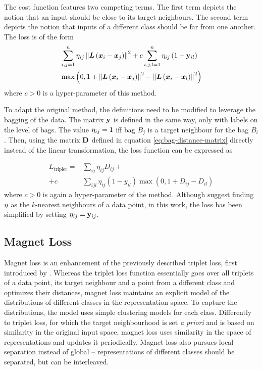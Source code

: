 The cost function features two competing terms. The first term depicts the notion that an input should be close to its target neighbours. The second term depicts the notion that inputs of a different class should be far from one another. The loss is of the form
\begin{align*}
	&\sum_{i, j = 1}^n \mathbf{\eta}_{ij} \left\lVert \bm{L} \left( \bm{x}_i - \bm{x}_j \right) \right\rVert^2 + c \sum_{i, j, l = 1}^n \mathbf{\eta}_{ij} \left( 1 - \mathbf{y}_{il} \right) \\
	&\max \left( 0, 1 + \left\lVert \bm{L} \left( \bm{x}_i - \bm{x}_j \right) \right\rVert^2 - \left\lVert \bm{L} \left( \bm{x}_i - \bm{x}_l \right) \right\rVert^2 \right)
\end{align*}
where \( c > 0 \) is a hyper-parameter of this method.

To adapt the original method, the definitions need to be modified to leverage the bagging of the data. The matrix \( \mathbf{y} \) is defined in the same way, only with labels on the level of bags. The value \( \mathbf{\eta}_{ij} = 1 \) iff bag \( B_j \) is a target neighbour for the bag \( B_i \). Then, using the matrix \( \mathbf{D} \) defined in equation \ref{eq:bag-distance-matrix} directly instead of the linear transformation, the loss function can be expressed as

\begin{align*}
	L_\mathrm{triplet} = &\sum_{ij} \eta_{ij} D_{ij} + \\
	+ c &\sum_{ijl} \eta_{ij} \left( 1 - y_{il} \right) \max \left( 0, 1 + D_{ij} - D_{il} \right)
\end{align*}
where \( c > 0 \) is again a hyper-parameter of the method. Although \cite{weinberger_distance_2006} suggest finding \( \mathbf{\eta} \) as the \( k \)-nearest neighbours of a data point, in this work, the loss has been simplified by setting \( \mathbf{\eta}_{ij} = \mathbf{y}_{ij} \).

\subsection{Magnet Loss}
Magnet loss is an enhancement of the previously described triplet loss, first introduced by \cite{rippel_metric_2015}. Whereas the triplet loss function essentially goes over all triplets of a data point, its target neighbour and a point from a different class and optimizes their distances, magnet loss maintains an explicit model of the distributions of different classes in the representation space. To capture the distributions, the model uses simple clustering models for each class. Differently to triplet loss, for which the target neighbourhood is set \textit{a priori} and is based on similarity in the original input space, magnet loss uses similarity in the space of representations and updates it periodically. Magnet loss also pursues local separation instead of global -- representations of different classes should be separated, but can be interleaved.

